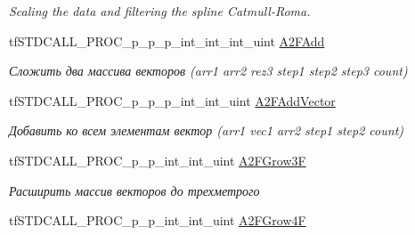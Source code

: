 \begin{DoxyCompactItemize}
\begin{DoxyCompactList}\small\item\em Scaling the data and filtering the spline Catmull-\/\-Roma. \end{DoxyCompactList}\item 
\hypertarget{structs_functions_array_vector_c_p_u_a4b925fd4f243ce9a16e6bca7cdcf95d9}{tf\-S\-T\-D\-C\-A\-L\-L\-\_\-\-P\-R\-O\-C\-\_\-p\-\_\-p\-\_\-p\-\_\-int\-\_\-int\-\_\-int\-\_\-uint \hyperlink{structs_functions_array_vector_c_p_u_a4b925fd4f243ce9a16e6bca7cdcf95d9}{A2\-F\-Add}}\label{structs_functions_array_vector_c_p_u_a4b925fd4f243ce9a16e6bca7cdcf95d9}

\begin{DoxyCompactList}\small\item\em Сложить два массива векторов (arr1 arr2 rez3 step1 step2 step3 count) \end{DoxyCompactList}\item 
\hypertarget{structs_functions_array_vector_c_p_u_aa640d84915bc57ddcaffa82df2e0fcb9}{tf\-S\-T\-D\-C\-A\-L\-L\-\_\-\-P\-R\-O\-C\-\_\-p\-\_\-p\-\_\-p\-\_\-int\-\_\-int\-\_\-uint \hyperlink{structs_functions_array_vector_c_p_u_aa640d84915bc57ddcaffa82df2e0fcb9}{A2\-F\-Add\-Vector}}\label{structs_functions_array_vector_c_p_u_aa640d84915bc57ddcaffa82df2e0fcb9}

\begin{DoxyCompactList}\small\item\em Добавить ко всем элементам вектор (arr1 vec1 arr2 step1 step2 count) \end{DoxyCompactList}\item 
\hypertarget{structs_functions_array_vector_c_p_u_a1e3b9d3c14910f5031647d5289ac148e}{tf\-S\-T\-D\-C\-A\-L\-L\-\_\-\-P\-R\-O\-C\-\_\-p\-\_\-p\-\_\-int\-\_\-int\-\_\-uint \hyperlink{structs_functions_array_vector_c_p_u_a1e3b9d3c14910f5031647d5289ac148e}{A2\-F\-Grow3\-F}}\label{structs_functions_array_vector_c_p_u_a1e3b9d3c14910f5031647d5289ac148e}

\begin{DoxyCompactList}\small\item\em Расширить массив векторов до трехметрого \end{DoxyCompactList}\item 
\hypertarget{structs_functions_array_vector_c_p_u_afba7f6f8c6b945dee0fc04f2d25cfb6b}{tf\-S\-T\-D\-C\-A\-L\-L\-\_\-\-P\-R\-O\-C\-\_\-p\-\_\-p\-\_\-int\-\_\-int\-\_\-uint \hyperlink{structs_functions_array_vector_c_p_u_afba7f6f8c6b945dee0fc04f2d25cfb6b}{A2\-F\-Grow4\-F}}\label{structs_functions_array_vector_c_p_u_afba7f6f8c6b945dee0fc04f2d25cfb6b}


\end{DoxyCompactItemize}
